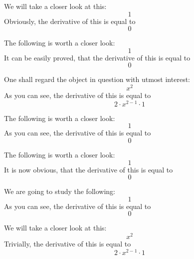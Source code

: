 \documentclass{article}
\begin{document}
We will take a closer look at this:
\begin{equation}
1 
\end{equation}
Obviously, the derivative of this is equal to
\begin{equation}
0 
\end{equation}

The following is worth a closer look:
\begin{equation}
1 
\end{equation}
It can be easily proved, that the derivative of this is equal to
\begin{equation}
0 
\end{equation}

One shall regard the object in question with utmost interest:
\begin{equation}
x ^{2 } 
\end{equation}
As you can see, the derivative of this is equal to
\begin{equation}
2 \cdot x ^{2 - 1 } \cdot 1 
\end{equation}

The following is worth a closer look:
\begin{equation}
1 
\end{equation}
As you can see, the derivative of this is equal to
\begin{equation}
0 
\end{equation}

The following is worth a closer look:
\begin{equation}
1 
\end{equation}
It is now obvious, that the derivative of this is equal to
\begin{equation}
0 
\end{equation}

We are going to study the following:
\begin{equation}
1 
\end{equation}
As you can see, the derivative of this is equal to
\begin{equation}
0 
\end{equation}

We will take a closer look at this:
\begin{equation}
x ^{2 } 
\end{equation}
Trivially, the derivative of this is equal to
\begin{equation}
2 \cdot x ^{2 - 1 } \cdot 1 
\end{equation}
\end{document}
